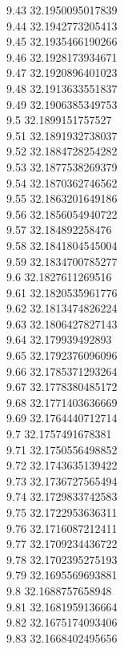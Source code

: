 {9.43	32.1950095017839\\
9.44	32.1942773205413\\
9.45	32.1935466190266\\
9.46	32.1928173934671\\
9.47	32.1920896401023\\
9.48	32.1913633551837\\
9.49	32.1906385349753\\
9.5	32.1899151757527\\
9.51	32.1891932738037\\
9.52	32.1884728254282\\
9.53	32.1877538269379\\
9.54	32.1870362746562\\
9.55	32.1863201649186\\
9.56	32.1856054940722\\
9.57	32.184892258476\\
9.58	32.1841804545004\\
9.59	32.1834700785277\\
9.6	32.1827611269516\\
9.61	32.1820535961776\\
9.62	32.1813474826224\\
9.63	32.1806427827143\\
9.64	32.179939492893\\
9.65	32.1792376096096\\
9.66	32.1785371293264\\
9.67	32.1778380485172\\
9.68	32.1771403636669\\
9.69	32.1764440712714\\
9.7	32.1757491678381\\
9.71	32.1750556498852\\
9.72	32.1743635139422\\
9.73	32.1736727565494\\
9.74	32.1729833742583\\
9.75	32.1722953636311\\
9.76	32.1716087212411\\
9.77	32.1709234436722\\
9.78	32.1702395275193\\
9.79	32.1695569693881\\
9.8	32.1688757658948\\
9.81	32.1681959136664\\
9.82	32.1675174093406\\
9.83	32.1668402495656\\
}
